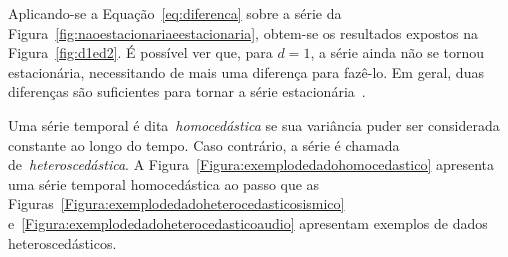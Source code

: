 Aplicando-se a Equação~\ref{eq:diferenca} sobre a série da
Figura~\ref{fig:naoestacionariaeestacionaria}, obtem-se os resultados expostos
na Figura~\ref{fig:d1ed2}. É possível ver que, para $d=1$, a série ainda não se
tornou estacionária, necessitando de mais uma diferença para fazê-lo. Em geral, duas diferenças são suficientes para tornar
a série estacionária~\citep{Livro:analiseseriestemporais}.

Uma série temporal é dita~\emph{homocedástica} se sua variância puder ser
considerada constante ao longo do tempo. Caso contrário, a série é chamada
de~\emph{heteroscedástica}. A Figura~\ref{Figura:exemplodedadohomocedastico}
apresenta uma série temporal homocedástica ao passo que as
Figuras~\ref{Figura:exemplodedadoheterocedasticosismico}
e~\ref{Figura:exemplodedadoheterocedasticoaudio} apresentam exemplos de dados
heteroscedásticos.

